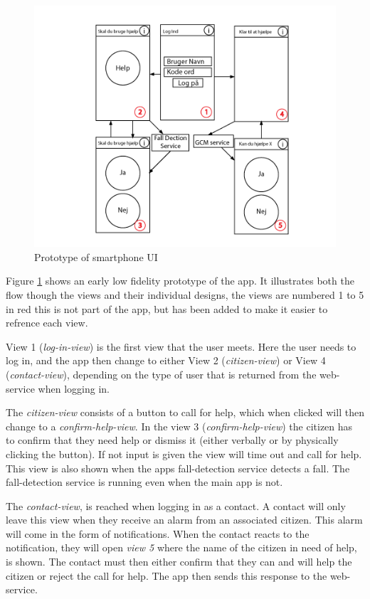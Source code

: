 \begin{figure}[H]
    \centering
    \includegraphics[width=1.0\textwidth]{Figures/MobilUI.png}
    \caption{Prototype of smartphone UI}
    \label{fig:mobilUI}
\end{figure}

Figure \ref{fig:mobilUI} shows an early low fidelity prototype of the app. It illustrates both the flow though the views and their individual designs, the views are numbered 1 to 5 in red this is not part of the app, but has been added to make it easier to refrence each view.


View 1 (\textit{log-in-view}) is the first view that the user meets. Here the user needs to log in, and the app then change to either View 2 (\textit{citizen-view}) or View 4 (\textit{contact-view}), depending on the type of user that is returned from the web-service when logging in.

The \textit{citizen-view} consists of a button to call for help, which when clicked will then change to a \textit{confirm-help-view}. In the view 3 (\textit{confirm-help-view}) the citizen has to confirm that they need help or dismiss it (either verbally or by physically clicking the button). If not input is given the view will time out and call for help. This view is also shown when the apps fall-detection service detects a fall. The fall-detection service is running even when the main app is not.

The \textit{contact-view}, is reached when logging in as a contact. A contact will only leave this view when they receive an alarm from an associated citizen. This alarm will come in the form of notifications. When the contact reacts to the notification, they will open \textit{view 5} where the name of the citizen in need of help, is shown. The contact must then either confirm that they can and will help the citizen or reject the call for help. The app then sends this response to the web-service.

